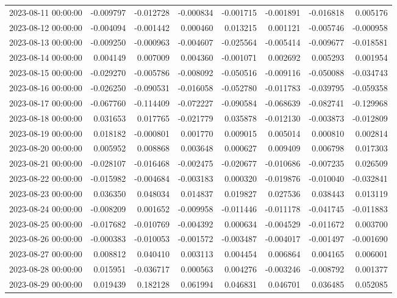 \begin{tabular}{lrrrrrrr}
2023-08-11 00:00:00 & -0.009797 & -0.012728 & -0.000834 & -0.001715 & -0.001891 & -0.016818 & 0.005176 \\
2023-08-12 00:00:00 & -0.004094 & -0.001442 & 0.000460 & 0.013215 & 0.001121 & -0.005746 & -0.000958 \\
2023-08-13 00:00:00 & -0.009250 & -0.000963 & -0.004607 & -0.025564 & -0.005414 & -0.009677 & -0.018581 \\
2023-08-14 00:00:00 & 0.004149 & 0.007009 & 0.004360 & -0.001071 & 0.002692 & 0.005293 & 0.001954 \\
2023-08-15 00:00:00 & -0.029270 & -0.005786 & -0.008092 & -0.050516 & -0.009116 & -0.050088 & -0.034743 \\
2023-08-16 00:00:00 & -0.026250 & -0.090531 & -0.016058 & -0.052780 & -0.011783 & -0.039795 & -0.059358 \\
2023-08-17 00:00:00 & -0.067760 & -0.114409 & -0.072227 & -0.090584 & -0.068639 & -0.082741 & -0.129968 \\
2023-08-18 00:00:00 & 0.031653 & 0.017765 & -0.021779 & 0.035878 & -0.012130 & -0.003873 & -0.012809 \\
2023-08-19 00:00:00 & 0.018182 & -0.000801 & 0.001770 & 0.009015 & 0.005014 & 0.000810 & 0.002814 \\
2023-08-20 00:00:00 & 0.005952 & 0.008868 & 0.003648 & 0.000627 & 0.009409 & 0.006798 & 0.017303 \\
2023-08-21 00:00:00 & -0.028107 & -0.016468 & -0.002475 & -0.020677 & -0.010686 & -0.007235 & 0.026509 \\
2023-08-22 00:00:00 & -0.015982 & -0.004684 & -0.003183 & 0.000320 & -0.019876 & -0.010040 & -0.032841 \\
2023-08-23 00:00:00 & 0.036350 & 0.048034 & 0.014837 & 0.019827 & 0.027536 & 0.038443 & 0.013119 \\
2023-08-24 00:00:00 & -0.008209 & 0.001652 & -0.009958 & -0.011446 & -0.011178 & -0.041745 & -0.011883 \\
2023-08-25 00:00:00 & -0.017682 & -0.010769 & -0.004392 & 0.000634 & -0.004529 & -0.011672 & 0.003700 \\
2023-08-26 00:00:00 & -0.000383 & -0.010053 & -0.001572 & -0.003487 & -0.004017 & -0.001497 & -0.001690 \\
2023-08-27 00:00:00 & 0.008812 & 0.040410 & 0.003113 & 0.004454 & 0.006864 & 0.004165 & 0.006001 \\
2023-08-28 00:00:00 & 0.015951 & -0.036717 & 0.000563 & 0.004276 & -0.003246 & -0.008792 & 0.001377 \\
2023-08-29 00:00:00 & 0.019439 & 0.182128 & 0.061994 & 0.046831 & 0.046701 & 0.036485 & 0.052085 \\

\end{tabular}
